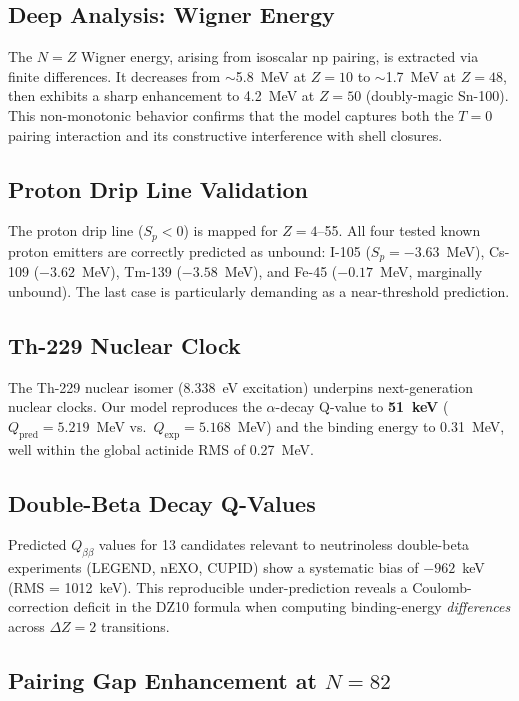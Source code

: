 \documentclass[letterpaper,11pt]{article}
\begin{document}
\subsection{Deep Analysis: Wigner Energy}

The $N = Z$ Wigner energy, arising from isoscalar np pairing, is extracted via
finite differences. It decreases from $\sim$5.8~MeV at $Z = 10$ to $\sim$1.7~MeV
at $Z = 48$, then exhibits a sharp enhancement to 4.2~MeV at $Z = 50$
(doubly-magic Sn-100). This non-monotonic behavior confirms that the model
captures both the $T = 0$ pairing interaction and its constructive interference
with shell closures.

\subsection{Proton Drip Line Validation}

The proton drip line ($S_p < 0$) is mapped for $Z = 4$--55. All four tested
known proton emitters are correctly predicted as unbound: I-105 ($S_p =
-3.63$~MeV), Cs-109 ($-3.62$~MeV), Tm-139 ($-3.58$~MeV), and Fe-45
($-0.17$~MeV, marginally unbound). The last case is particularly demanding
as a near-threshold prediction.

\subsection{Th-229 Nuclear Clock}

The Th-229 nuclear isomer (8.338~eV excitation) underpins next-generation
nuclear clocks. Our model reproduces the $\alpha$-decay Q-value to
\textbf{51~keV} ($Q_\text{pred} = 5.219$~MeV vs.\ $Q_\text{exp} =
5.168$~MeV) and the binding energy to 0.31~MeV, well within the global
actinide RMS of 0.27~MeV.

\subsection{Double-Beta Decay Q-Values}

Predicted $Q_{\beta\beta}$ values for 13 candidates relevant to
neutrinoless double-beta experiments (LEGEND, nEXO, CUPID) show a
systematic bias of $-962$~keV (RMS = 1012~keV). This reproducible
under-prediction reveals a Coulomb-correction deficit in the DZ10 formula
when computing binding-energy \emph{differences} across $\Delta Z = 2$
transitions.

\subsection{Pairing Gap Enhancement at $N=82$}
\end{document}
